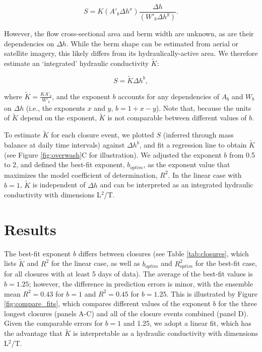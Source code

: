 \documentclass[preprint,12pt,authoryear]{elsarticle}
\begin{document}
\begin{equation}
    S = K (A'_b \Delta h^x) \frac{\Delta h}{ (W'_b \Delta h^y)}.
    \label{eq:Darcy_w_exponents}
\end{equation}

However, the flow cross-sectional area and berm width are unknown, as are their dependencies on $\Delta h$.  While the berm shape can be estimated from aerial or satellite imagery, this likely differs from its hydraulically-active area. We therefore estimate an `integrated’ hydraulic conductivity $\tilde K$:

\begin{equation}
    S = \tilde K  \Delta h^b,
    \label{eq:tildeK}
\end{equation}

 \noindent where $\tilde K =  \frac{K A'_b}{ W'_b}$, and the exponent $b$ accounts for any dependencies of $A_b$ and $W_b$ on $\Delta h$ (i.e., the exponents $x$ and $y$, $b = 1 + x - y$). Note that, because the units of $\tilde K$  depend on the exponent, $\tilde K$  is not comparable between different values of $b$. 

To estimate $\tilde K$ for each closure event,
 we plotted $S$ (inferred through mass balance at daily time intervals) against $\Delta h^b$, and fit a regression line to obtain $\tilde K$ (see Figure \ref{fig:overwash}C for illustration). We adjusted the exponent $b$ from 0.5 to 2, and defined the  best-fit exponent, $b_{optim}$, as the exponent value that maximizes the model coefficient of determination, $R^2$. In the linear case with $b = 1$, $\tilde K$ is independent of  $\Delta h$ and can be interpreted as an integrated hydraulic conductivity with dimensions L$^2$/T. 

\section{Results}

The best-fit exponent $b$ differs between closures (see Table \ref{tab:closures}, which lists $\tilde K$ and $R^2$ for the linear case, as well as $b_{optim}$ and $R^2_{optim}$ for the best-fit case, for all closures with at least 5 days of data). The average of the best-fit values is $b = 1.25$; however, the difference in prediction errors is minor, with the ensemble mean $R^2=0.43$ for $b = 1$ and  $R^2=0.45$ for $b = 1.25$. This is illustrated by Figure \ref{fig:compare_fits}, which compares different values of the exponent $b$ for the three longest closures (panels A-C) and all of the closure events combined (panel D). Given the comparable errors for $b = 1$ and 1.25, we adopt a linear fit, which  has the advantage that $\tilde K$ is interpretable as a hydraulic conductivity with dimensions L$^2$/T.
\end{document}
